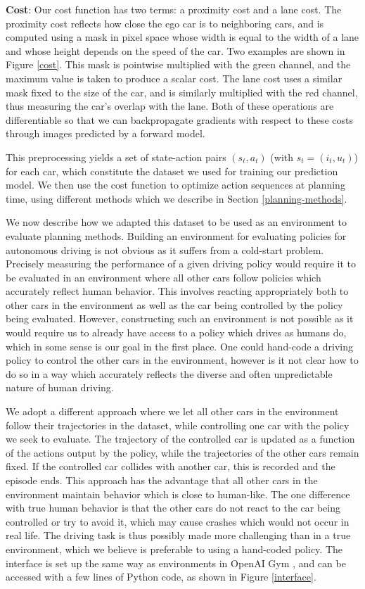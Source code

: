 \documentclass{article} %
\begin{document}
\textbf{Cost}: Our cost function has two terms: a proximity cost and a lane cost. The proximity cost reflects how close the ego car is to neighboring cars, and is computed using a mask in pixel space whose width is equal to the width of a lane and whose height depends on the speed of the car. Two examples are shown in Figure \ref{cost}.
This mask is pointwise multiplied with the green channel, and the maximum value is taken to produce a scalar cost.
The lane cost uses a similar mask fixed to the size of the car, and is similarly multiplied with the red channel, thus measuring the car's overlap with the lane.
Both of these operations are differentiable so that we can backpropagate gradients with respect to these costs through images predicted by a forward model.

This preprocessing yields a set of state-action pairs $(s_t, a_t)$ (with $s_t=(i_t, u_t)$) for each car, which constitute the dataset we used for training our prediction model.
We then use the cost function to optimize action sequences at planning time, using different methods which we describe in Section \ref{planning-methods}.

We now describe how we adapted this dataset to be used as an environment to evaluate planning methods.
Building an environment for evaluating policies for autonomous driving is not obvious as it suffers from a cold-start problem.
Precisely measuring the performance of a given driving policy would require it to be evaluated in an environment where all other cars follow policies which accurately reflect human behavior.
This involves reacting appropriately both to other cars in the environment as well as the car being controlled by the policy being evaluated.
However, constructing such an environment is not possible as it would require us to already have access to a policy which drives as humans do, which in some sense is our goal in the first place. One could hand-code a driving policy to control the other cars in the environment, however is it not clear how to do so in a way which accurately reflects the diverse and often unpredictable nature of human driving.

We adopt a different approach where we let all other cars in the environment follow their trajectories in the dataset, while controlling one car with the policy we seek to evaluate.
The trajectory of the controlled car is updated as a function of the actions output by the policy, while the trajectories of the other cars remain fixed.
If the controlled car collides with another car, this is recorded and the episode ends.
This approach has the advantage that all other cars in the environment maintain behavior which is close to human-like.
The one difference with true human behavior is that the other cars do not react to the car being controlled or try to avoid it, which may cause crashes which would not occur in real life.
The driving task is thus possibly made more challenging than in a true environment, which we believe is preferable to using a hand-coded policy.
The interface is set up the same way as environments in OpenAI Gym \citep{OpenAIBaselines}, and can be accessed with a few lines of Python code, as shown in Figure \ref{interface}.
\end{document}
